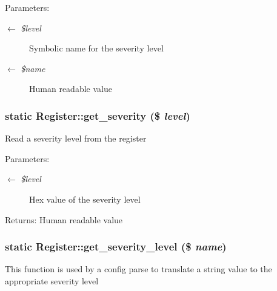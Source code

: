 \begin{Desc}
\item[Parameters:]
\begin{description}
\item[\mbox{$\leftarrow$} {\em \$level}]Symbolic name for the severity level \item[\mbox{$\leftarrow$} {\em \$name}]Human readable value \end{description}
\end{Desc}
\hypertarget{classRegister_e71e10bddb03483b54ad22b9edb95b7c}{
\subsubsection{\setlength{\rightskip}{0pt plus 5cm}static Register::get\_\-severity (\$ {\em level})}}
\label{classRegister_e71e10bddb03483b54ad22b9edb95b7c}


Read a severity level from the register

\begin{Desc}
\item[Parameters:]
\begin{description}
\item[\mbox{$\leftarrow$} {\em \$level}]Hex value of the severity level \end{description}
\end{Desc}
\begin{Desc}
\item[Returns:]Human readable value \end{Desc}
\hypertarget{classRegister_70490e59a4a3b910d259b8a4287c3e91}{
\subsubsection{\setlength{\rightskip}{0pt plus 5cm}static Register::get\_\-severity\_\-level (\$ {\em name})}}
\label{classRegister_70490e59a4a3b910d259b8a4287c3e91}


This function is used by a config parse to translate a string value to the appropriate severity level


